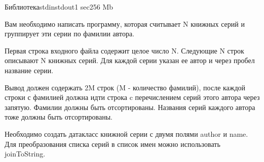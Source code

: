 \begin{problem}{Библиотека}{stdin}{stdout}{1 sec}{256 Mb}

Вам необходимо написать программу, которая считывает N книжных серий и группирует эти серии по фамилии автора.

\InputFile

Первая строка входного файла содержит целое число N. Следующие N строк описывают N книжных серий. Для каждой серии указан
ее автор и через пробел название серии.

\OutputFile

Вывод должен содержать 2M строк (M - количество фамилий), после каждой строки с фамилией должна идти строка c перечислением серий
этого автора через запятую. Фамилии должны быть отсортированы. Названия серий каждого автора тоже должны быть отсортированы.
\Example

\begin{example}
%
\end{example}

\Note

Необходимо создать датакласс книжной серии с двумя полями author и name.
Для преобразования списка серий в список имен можно использовать joinToString.

\end{problem}